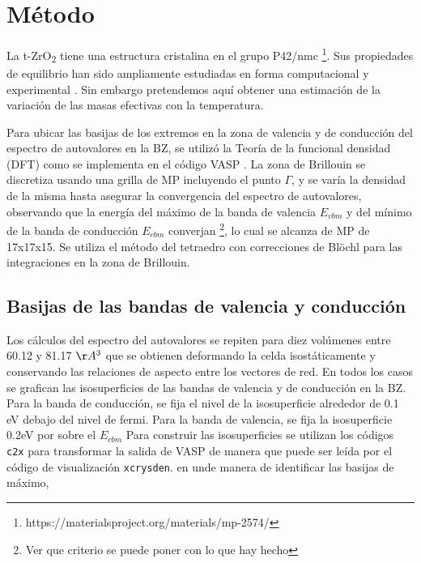\section{Método}

La t-ZrO\textsubscript{2} tiene una estructura cristalina en el grupo 
P42/nmc \footnote{https://materialsproject.org/materials/mp-2574/}. Sus 
propiedades de equilibrio han sido ampliamente estudiadas en forma 
computacional y experimental \cite{Milman2009, Garcia2006}. Sin embargo
pretendemos aquí obtener una estimación de la variación de las masas 
efectivas con la temperatura.

Para ubicar las basijas de los extremos en la zona de valencia y de conducción
del espectro de autovalores en la BZ, se utilizó la Teoría de la funcional densidad (DFT)
\cite{PhysRev.136.B864, PhysRev.140.A1133} como se implementa en el código VASP \cite{doi:10.1002/jcc.21057}.
La zona de Brillouin se discretiza usando una grilla de MP incluyendo el punto $\Gamma$, y se varía la 
densidad de la misma hasta asegurar la convergencia del espectro de autovalores, observando que
la energía del máximo de la banda de valencia $E_{vbm}$ y del mínimo de la banda de conducción 
$E_{cbm}$ converjan \footnote{Ver que criterio se puede poner con lo que hay hecho},
lo cual se alcanza de MP\cite{PhysRevB.13.5188}
de 17x17x15. Se utiliza el método del tetraedro con correcciones de Blöchl\cite{Blochl1994} 
para las integraciones en la zona de Brillouin.

\subsection{Basijas de las bandas de valencia y conducción}
Los cálculos del espectro del autovalores se repiten para diez volúmenes 
entre 60.12 y 81.17 $\AA^3$ que se obtienen deformando la celda isostáticamente y conservando
las relaciones de aspecto entre los vectores de red. En todos los casos se grafican las 
isosuperficies de las bandas de valencia y de conducción en la BZ. Para la banda de conducción, se fija 
el nivel de la isosuperficie alrededor de 0.1 eV debajo del nivel de fermi. Para la banda de valencia, 
se fija la isosuperficie 0.2eV por sobre el $E_{cbm}$
Para construir las isosuperficies se utilizan los códigos \texttt{c2x}\cite{Rutter2018}
para transformar la salida de VASP de manera que puede ser leída por el código de visualización
\texttt{xcrysden}\cite{Kokalj1999}.
en unde manera de identificar las basijas de máximo,

